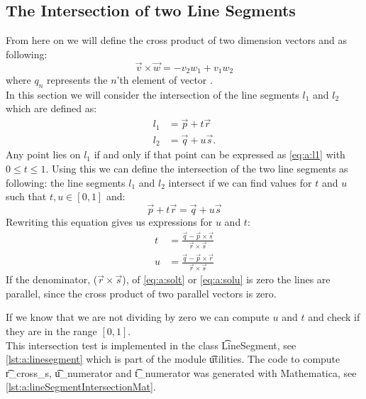 \subsection*{The Intersection of two Line Segments}
	From here on we will define the cross product of two dimension vectors  and  as following:
	\begin{equation}\label{eq:a:crossproduct}
		\vec{v} \times \vec{w} = - v_2 w_1 + v_1 w_2
	\end{equation}
	where $q_n$ represents the $n$'th element of vector .\\

	In this section we will consider the intersection of the line segments $l_1$ and $l_2$ \cite{so} which are defined as:
	\begin{align}
		l_1 &= \vec{p} + t \vec{r} \label{eq:a:l1}\\
		l_2 &= \vec{q} + u \vec{s} \label{eq:a:l2}.
	\end{align}
	Any point lies on $l_1$ if and only if that point can be expressed as \eqref{eq:a:l1} with $0 \leq t \leq 1$. Using this we can define the intersection  of the two line segments as following: the line segments $l_1$ and $l_2$ intersect if we can find values for $t$ and $u$ such that $t, u \in [0, 1]$ and:
		\begin{equation}
			\vec{p} + t \vec{r} = \vec{q} + u \vec{s}
		\end{equation}
	Rewriting this equation gives us expressions for $u$ and $t$:
	\begin{align}
		t &= \frac{\vec{q} - \vec{p} \times \vec{s}}{\vec{r} \times \vec{s}} \label{eq:a:solt}\\
		u &= \frac{\vec{q} - \vec{p} \times \vec{r}}{\vec{r} \times \vec{s}} \label{eq:a:solu}
	\end{align}
	If the denominator, ($\vec{r} \times \vec{s}$), of \eqref{eq:a:solt} or \eqref{eq:a:solu} is zero the lines are parallel, since the cross product of two parallel vectors is zero.

	If we know that we are not dividing by zero we can compute $u$ and $t$ and check if they are in the range $[0,1]$.\\

	This intersection test is implemented in the class \t{LineSegment}, see \autoref{lst:a:linesegment} which is part of the module \t{utilities}. The code to compute \t{r_cross_s}, \t{u_numerator} and \t{t_numerator} was generated with Mathematica, see \autoref{lst:a:lineSegmentIntersectionMat}.\\

